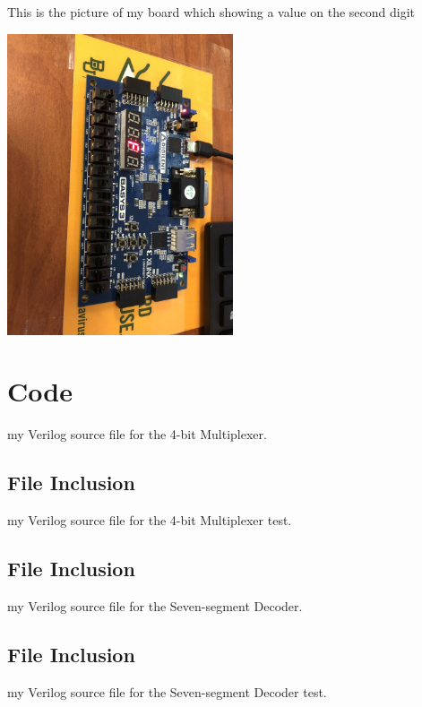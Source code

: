\documentclass[11pt]{article}
\newcommand{\Verilog}[2][]{%
	
}
\begin{document}
	This is the picture of my board which showing a value on the second digit\\	
	\begin{center}
		\includegraphics[width=0.5\textwidth]{board_picture2}
	\end{center}



\section*{Code}

my Verilog source file for the 4-bit Multiplexer.\\
\subsection*{File Inclusion}
\Verilog[caption=4-bit Multiplexer Verilog code,label=code:file_ex]{mux2_4b.sv}
my Verilog source file for the 4-bit Multiplexer test.\\
\subsection*{File Inclusion}
\Verilog[caption=4-bit Multiplexer Test Benches Verilog code,label=code:file_ex]{mux2_4b_test.sv}

my Verilog source file for the Seven-segment Decoder.\\
\subsection*{File Inclusion}
\Verilog[caption=Seven-segment Decoder Verilog code,label=code:file_ex]{sseg_decoder.sv}
my Verilog source file for the Seven-segment Decoder test.\\
\end{document}
